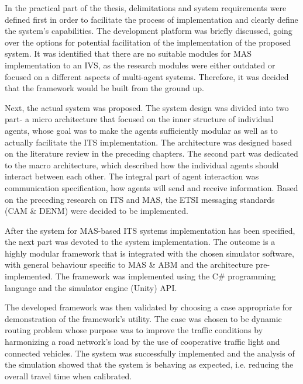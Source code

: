 \documentclass[titlepage, 12pt]{article}
\begin{document}
In the practical part of the thesis, delimitations and system requirements were defined first in order to facilitate the 
process of implementation and clearly define the system's capabilities. The development platform was briefly discussed, 
going over the options for potential facilitation of the implementation of the proposed system. It was identified that 
there are no suitable modules for MAS implementation to an IVS, as the research modules were either outdated or focused on 
a different aspects of multi-agent systems. Therefore, it was decided that the framework would be built from the ground up.

Next, the actual system was proposed. The system design was divided into two part- a micro
architecture that focused on the inner structure of individual agents, whose goal was to make
the agents sufficiently modular as well as to actually facilitate the ITS implementation. The
architecture was designed based on the literature review in the preceding chapters. The second
part was dedicated to the macro architecture, which described how the individual agents should
interact between each other. The integral part of agent interaction was communication
specification, how agents will send and receive information.  Based on the preceding research
on ITS and MAS, the ETSI messaging standards (CAM \& DENM) were decided to be implemented.

After the system for MAS-based ITS systems implementation has been specified, the next part was
devoted to the system implementation.  The outcome is a highly modular framework that is
integrated with the chosen simulator software, with general behaviour specific to MAS \& ABM 
and the architecture pre-implemented. The framework was implemented using the C\# programming 
language and the simulator engine (Unity) API. 

The developed framework was then validated by choosing a case appropriate for demonstration of the 
framework's utility. The case was chosen to be dynamic routing problem whose purpose was to 
improve the traffic conditions by harmonizing a road network's load by the use of cooperative 
traffic light and connected vehicles. The system was successfully implemented and the analysis of the 
simulation showed that the system is behaving as expected, i.e. reducing the overall travel time when 
calibrated.


\clearpage

\thispagestyle{empty}
\listoftables
\listoffigures
\clearpage

\printbibliography
\end{document}
